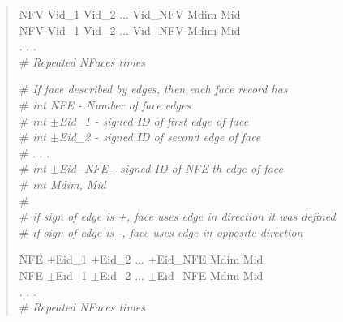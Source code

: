 \documentclass[12pt]{article}
\begin{document}
\begin{verse}
NFV \hspace{0.5ex} Vid\_1 \hspace{0.5ex} Vid\_2 \hspace{0.5ex} ... \hspace{0.5ex} Vid\_NFV \hspace{0.5ex} Mdim \hspace{0.5ex} Mid \\
NFV \hspace{0.5ex} Vid\_1 \hspace{0.5ex} Vid\_2 \hspace{0.5ex} ... \hspace{0.5ex} Vid\_NFV \hspace{0.5ex} Mdim \hspace{0.5ex} Mid \\
. . . \\
\# {\em Repeated NFaces times}
\vspace{2ex}\vspace{1ex}

\# {\em If face described by edges, then each face record has} \\
\# {\em {\em int} NFE - Number of face edges} \\
\# {\em {\em int} $\pm$Eid\_1 - signed ID of first edge of face} \\
\# {\em {\em int} $\pm$Eid\_2 - signed ID of second edge of face} \\
\# . . . \\
\# {\em {\em int} $\pm$Eid\_NFE - signed ID of NFE'th edge of face} \\
\# {\em {\em int} Mdim, Mid} \\
\# \\
\# {\em if sign of edge is +, face uses edge in direction it was defined} \\
\# {\em if sign of edge is -, face uses edge in opposite direction} \\
\vspace{1ex}

NFE \hspace{0.5ex} $\pm$Eid\_1 \hspace{0.5ex} $\pm$Eid\_2 \hspace{0.5ex} ... \hspace{0.5ex} $\pm$Eid\_NFE \hspace{0.5ex} Mdim Mid \\
NFE \hspace{0.5ex} $\pm$Eid\_1 \hspace{0.5ex} $\pm$Eid\_2 \hspace{0.5ex} ... \hspace{0.5ex} $\pm$Eid\_NFE \hspace{0.5ex} Mdim Mid \\
. . . \\
\# {\em Repeated NFaces times}
\vspace{2ex}\vspace{1ex}



\end{verse}
\end{document}
